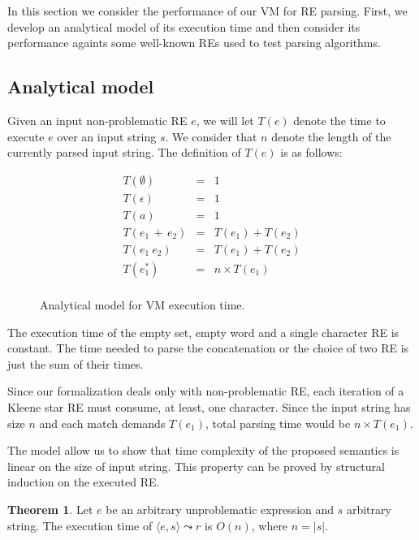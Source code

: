 \documentclass[review]{elsarticle}
\theoremstyle{definition}
\newtheorem{Theorem}{Theorem}
\begin{document}
In this section we consider the performance of our VM for RE parsing. First, we 
develop an analytical model of its execution time and then consider its
performance againts some well-known REs used to test parsing algorithms.

\subsection{Analytical model}

Given an input non-problematic RE $e$, we will let $T(e)$ denote the 
time to execute $e$ over an input string $s$. We consider that $n$ denote
the length of the currently parsed input string. The definition of $T(e)$
is as follows:

\begin{figure}[H]
  \[
    \begin{array}{lcl}
      T(\emptyset)   & = & 1 \\
      T(\epsilon)    & = & 1 \\ 
      T(a)           & = & 1 \\ 
      T(e_1\,+\,e_2) & = & T(e_1) + T(e_2) \\
      T(e_1\:e_2)    & = & T(e_1) + T(e_2) \\
      T(e_1^*)       & = & n\times T(e_1) \\
    \end{array}
  \]
  \caption{Analytical model for VM execution time.}
  \label{figure:model}
\end{figure}

The execution time of the empty set, empty word and a 
single character RE is constant. The time needed to 
parse the concatenation or the choice of two RE is just the 
sum of their times.

Since our formalization deals only with non-problematic RE, 
each iteration of a Kleene star RE must consume, 
at least, one character. Since the input string has size 
$n$ and each match demands $T(e_1)$, total parsing time would
be $n\times T(e_1)$. 

The model allow us to show that time complexity of the 
proposed semantics is linear on the size of input string.
This property can be proved by structural induction on 
the executed RE.

\begin{Theorem}
  Let $e$ be an arbitrary unproblematic expression and $s$ arbitrary string.
  The execution time of $\langle e, s \rangle\leadsto r$ is $O(n)$, where $n = |s|$.
\end{Theorem}
\end{document}
